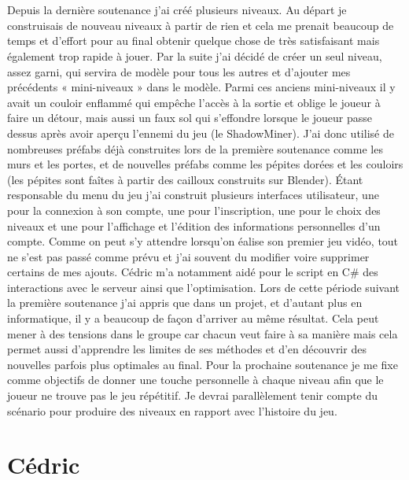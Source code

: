 \documentclass[titlepage, 13px, a4paper]{article}
\begin{document}
\paragraph{} \hspace{0pt} \\
Depuis la dernière soutenance j'ai créé plusieurs niveaux. 
Au départ je construisais de nouveau niveaux à partir de rien et cela me prenait beaucoup de temps et d'effort pour au final 
obtenir quelque chose de très satisfaisant mais également trop rapide à jouer. Par la suite j'ai décidé de créer un seul niveau, 
assez garni, qui servira de modèle pour tous les autres et d'ajouter mes précédents « mini-niveaux » dans le modèle. 
Parmi ces anciens mini-niveaux il y avait un couloir enflammé qui empêche l'accès à la sortie et oblige le joueur à faire un détour, 
mais aussi un faux sol qui s’effondre lorsque le joueur passe dessus après avoir aperçu l'ennemi du jeu (le ShadowMiner). J'ai donc 
utilisé de nombreuses préfabs déjà construites lors de la première soutenance comme les murs et les portes, et de nouvelles préfabs 
comme les pépites dorées et les couloirs (les pépites sont faîtes à partir des cailloux construits sur Blender). Étant responsable du 
menu du jeu j'ai construit plusieurs interfaces utilisateur, une pour la connexion à son compte, une pour l'inscription, une pour le 
choix des niveaux et une pour l'affichage et l’édition des informations personnelles d'un compte. Comme on peut s'y attendre lorsqu'on 
éalise son premier jeu vidéo, tout ne s'est pas passé comme prévu et j'ai souvent du modifier voire supprimer certains de mes ajouts. 
Cédric m'a notamment aidé pour le script en C\# des interactions avec le serveur ainsi que l'optimisation. Lors de cette période suivant 
la première soutenance j'ai appris que dans un projet, et d'autant plus en informatique, il y a beaucoup de façon d'arriver au même résultat. 
Cela peut mener à des tensions dans le groupe car chacun veut faire à sa manière mais cela permet aussi d'apprendre les limites de ses méthodes 
et d’en découvrir des nouvelles parfois plus optimales au final. Pour la prochaine soutenance je me fixe comme objectifs de donner
 une touche personnelle à chaque niveau afin que le joueur ne trouve pas le jeu répétitif. Je devrai parallèlement tenir compte 
 du scénario pour produire des niveaux en rapport avec l'histoire du jeu.


\newpage





\section{Cédric}
\end{document}
